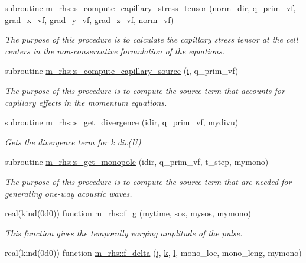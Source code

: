 \begin{DoxyCompactItemize}
subroutine \hyperlink{namespacem__rhs_af771a6193fc6e856bcbfc269f096e3c9}{m\+\_\+rhs\+::s\+\_\+compute\+\_\+capillary\+\_\+stress\+\_\+tensor} (norm\+\_\+dir, q\+\_\+prim\+\_\+vf, grad\+\_\+x\+\_\+vf, grad\+\_\+y\+\_\+vf, grad\+\_\+z\+\_\+vf, norm\+\_\+vf)
\begin{DoxyCompactList}\small\item\em The purpose of this procedure is to calculate the capillary stress tensor at the cell centers in the non-\/conservative formulation of the equations. \end{DoxyCompactList}\item 
subroutine \hyperlink{namespacem__rhs_aca45586b8c966f8e3a5477444cf60dda}{m\+\_\+rhs\+::s\+\_\+compute\+\_\+capillary\+\_\+source} (\hyperlink{m__rhs_8f90_aaea4baed8fd8b780f6938f0dc1fb0f72}{i}, q\+\_\+prim\+\_\+vf)
\begin{DoxyCompactList}\small\item\em The purpose of this procedure is to compute the source term that accounts for capillary effects in the momentum equations. \end{DoxyCompactList}\item 
subroutine \hyperlink{namespacem__rhs_aacbe385f29e71aa174541d4931bdcbbe}{m\+\_\+rhs\+::s\+\_\+get\+\_\+divergence} (idir, q\+\_\+prim\+\_\+vf, mydivu)
\begin{DoxyCompactList}\small\item\em Gets the divergence term for k div(\+U) \end{DoxyCompactList}\item 
subroutine \hyperlink{namespacem__rhs_ae064d7adeace0bde4fc2b42d437a01b1}{m\+\_\+rhs\+::s\+\_\+get\+\_\+monopole} (idir, q\+\_\+prim\+\_\+vf, t\+\_\+step, mymono)
\begin{DoxyCompactList}\small\item\em The purpose of this procedure is to compute the source term that are needed for generating one-\/way acoustic waves. \end{DoxyCompactList}\item 
real(kind(0d0)) function \hyperlink{namespacem__rhs_ad316cbfbf94736b4677bacf07d8d9027}{m\+\_\+rhs\+::f\+\_\+g} (mytime, sos, mysos, mymono)
\begin{DoxyCompactList}\small\item\em This function gives the temporally varying amplitude of the pulse. \end{DoxyCompactList}\item 
real(kind(0d0)) function \hyperlink{namespacem__rhs_a87bc24802f4abe7b3cb36864d631a275}{m\+\_\+rhs\+::f\+\_\+delta} (\hyperlink{m__rhs_8f90_aeadbc0ce9b66517f8fde156199772ec1}{j}, \hyperlink{m__rhs_8f90_af22c486581933c52df7d4aa306382074}{k}, \hyperlink{m__rhs_8f90_a2ac747380de0e6e5e11b01f4137fb75c}{l}, mono\+\_\+loc, mono\+\_\+leng, mymono)

\end{DoxyCompactItemize}
